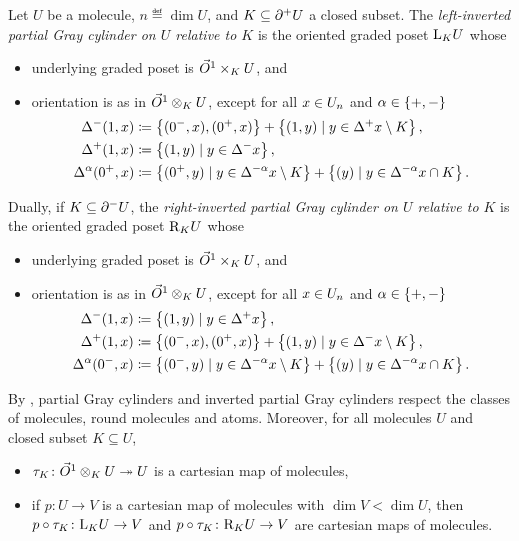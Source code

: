\begin{dfn}
	Let \( U \) be a molecule, \( n \eqdef \dim U \), and \( K \subseteq \bd{}{+}U \) a closed subset.
	The \emph{left-inverted partial Gray cylinder on \( U \) relative to \( K \)} is the oriented graded poset \( \lcyl{K} U \) whose
    \begin{itemize}
        \item underlying graded poset is \( \arr \times_K U \), and
        \item orientation is as in \( \arr \gray_K U \), except for all \( x \in \gr{n}{U} \) and \( \a \in \set{+, -} \)
    \begin{align*}
        \faces{}{-}(1, x) &\eqdef \set{(0^-, x), (0^+, x)} + \set{(1, y) \mid y \in \faces{}{+}x \setminus K}, \\
        \faces{}{+}(1, x) &\eqdef \set{(1, y) \mid y \in \faces{}{-}x}, \\
        \faces{}{\a}(0^+, x) &\eqdef \set{(0^+, y) \mid y \in \faces{}{-\a}x \setminus K} + 
            \set{(y) \mid y \in \faces{}{-\a}x \cap K}.
    \end{align*}
\end{itemize}
	Dually, if \( K \subseteq \bd{}{-}U \), the \emph{right-inverted partial Gray cylinder on \( U \) relative to \( K \)} is the oriented graded poset \( \rcyl{K}{U} \) whose
    \begin{itemize}
        \item underlying graded poset is \( \arr \times_K U \), and
        \item orientation is as in \( \arr \gray_K U \), except for all \( x \in \gr{n}{U} \) and \( \a \in \set{+, -} \)
        \begin{align*}
            \faces{}{-}(1, x) &\eqdef \set{(1, y) \mid y \in \faces{}{+}x}, \\
            \faces{}{+}(1, x) &\eqdef \set{(0^-, x), (0^+, x)} + \set{(1, y) \mid y \in \faces{}{-}x \setminus K}, \\
            \faces{}{\a}(0^-, x) &\eqdef \set{(0^-, y) \mid y \in \faces{}{-\a}x \setminus K} + 
                \set{(y) \mid y \in \faces{}{-\a}x \cap K}.
        \end{align*}
    \end{itemize}
\end{dfn}

\begin{rmk} \label{rmk:inverted_cylinder_well_def}
	By \cite[Lemma 1.20, Lemma 1.26]{chanavat2024equivalences}, partial Gray cylinders and inverted partial Gray cylinders respect the classes of molecules, round molecules and atoms.
	Moreover, for all molecules \( U \) and closed subset \( K \subseteq U \),
	\begin{itemize}
		\item \( \tau_K \colon \arr \gray_K U \surj U \) is a cartesian map of molecules,
		\item if \( p \colon U \to V \) is a cartesian map of molecules with \( \dim V < \dim U \), then \( p \after \tau_K \colon \lcyl{K}{U} \to V \) and \( p \after \tau_K \colon \rcyl{K}{U} \to V \) are cartesian maps of molecules.
	\end{itemize}
\end{rmk}

